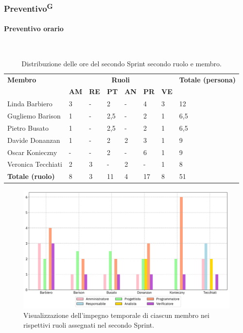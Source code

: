 \documentclass[8pt]{article}
\newcommand{\glossterm}[1]{#1\textsuperscript{G}} %
\newcommand{\subsubsubsection}[1]{\paragraph{#1}\mbox{}\\}
\begin{document}
\subsubsection{\glossterm{Preventivo}}
\subsubsubsection{Preventivo orario}
\begin{table}[ht!]
	\centering
	\begin{tabular}{p{4cm} p{1cm} p{1cm} p{1cm} p{1cm} p{1cm} p{1cm} p{3cm}}
        \toprule
        \textbf{Membro} & \multicolumn{6}{c}{\textbf{Ruoli}} & \textbf{Totale (persona)}\\
		& \textbf{AM} & \textbf{RE} & \textbf{PT} & \textbf{AN} & \textbf{PR} & \textbf{VE}\\
		\midrule
        Linda Barbiero & 3 & - & 2 & - & 4 & 3 & 12 \\ 
        Gugliemo Barison & 1 & - & 2,5 & - & 2 & 1 & 6,5 \\ 
        Pietro Busato & 1 & - & 2,5 & - & 2 & 1 & 6,5 \\ 
        Davide Donanzan & 1 & - & 2 & 2 & 3 & 1 & 9 \\ 
        Oscar Konieczny & - & - & 2 & - & 6 & 1 & 9 \\ 
        Veronica Tecchiati & 2 & 3 & - & 2 & - & 1 & 8 \\ 
        \midrule
        \textbf{Totale (ruolo)} & 8 & 3 & 11 & 4 & 17 & 8 & 51 \\     
        \bottomrule
    \end{tabular}
	\caption{Distribuzione delle ore del secondo Sprint secondo ruolo e membro.}
	\label{table:Distribuzione delle ore del secondo Sprint secondo ruolo e membro}
\end{table}
\begin{figure}[ht!]
    \centering
    \includegraphics[width=15cm]{./images_pdp/istogramma_periodo_2.png}
    \caption{Visualizzazione dell’impegno temporale di ciascun membro nei rispettivi ruoli assegnati
    nel secondo Sprint.}
    \label{figure:Visualizzazione dell’impegno temporale di ciascun membro nei rispettivi ruoli
    assegnati nel secondo Sprint}
\end{figure}
\end{document}
